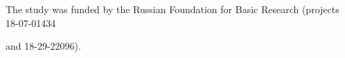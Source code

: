       


      

         




        


        

        \Ack

        \noindent

         The study was funded by the Russian Foundation for Basic Research (projects 18-07-01434

         and 18-29-22096).

        


        

        \renewcommand{\bibname}{\protect\rmfamily References}


        

